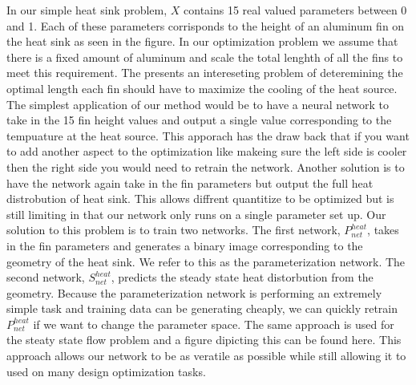 \documentclass{article} %
\begin{document}
In our simple heat sink problem, $X$ contains 15 real valued parameters between 0 and 1. Each of these parameters corrisponds to the height of an aluminum fin on the heat sink as seen in the figure. In our optimization problem we assume that there is a fixed amount of aluminum and scale the total lenghth of all the fins to meet this requirement. The presents an intereseting problem of deteremining the optimal length each fin should have to maximize the cooling of the heat source. The simplest application of our method would be to have a neural network to take in the 15 fin height values and output a single value corresponding to the tempuature at the heat source. This apporach has the draw back that if you want to add another aspect to the optimization like makeing sure the left side is cooler then the right side you would need to retrain the network. Another solution is to have the network again take in the fin parameters but output the full heat distrobution of heat sink. This allows diffrent quantitize to be optimized but is still limiting in that our network only runs on a single parameter set up. Our solution to this problem is to train two networks. The first network, $P^{heat}_{net}$, takes in the fin parameters and generates a binary image corresponding to the geometry of the heat sink. We refer to this as the parameterization network. The second network, $S^{heat}_{net}$, predicts the steady state heat distorbution from the geometry. Because the parameterization network is performing an extremely simple task and training data can be generating cheaply, we can quickly retrain $P^{heat}_{net}$ if we want to change the parameter space. The same approach is used for the steaty state flow problem and a figure dipicting this can be found here. This approach allows our network to be as veratile as possible while still allowing it to used on many design optimization tasks.
\end{document}
